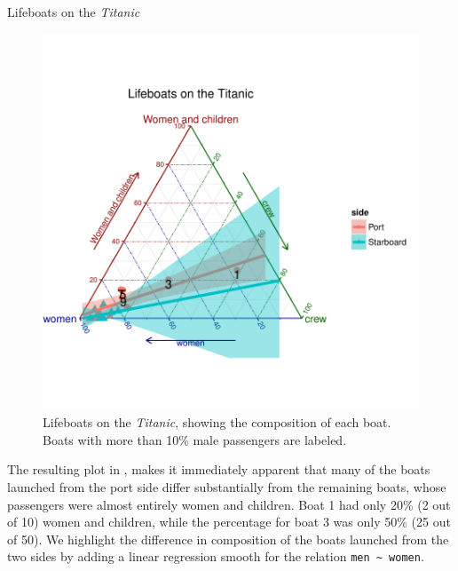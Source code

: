 \documentclass[11pt]{book}
\renewenvironment{knitrout}{\small\renewcommand{\baselinestretch}{.85}}{} %
\begin{document}
\begin{Example}[lifeboat1]{Lifeboats on the \emph{Titanic}}
\begin{knitrout}
\begin{figure}[!htbp]
\centerline{\includegraphics[width=.7\textwidth,clip]{ch04/fig/lifeboats1} }

\caption[Lifeboats on the Titanic]{Lifeboats on the \emph{Titanic}, showing the composition of each boat.  Boats with more than 10\% male passengers are labeled.\label{fig:lifeboats1}}
\end{figure}


\end{knitrout}
The resulting plot in , makes it immediately apparent
that many of the boats launched from the port side differ substantially
from the remaining boats, whose passengers were almost entirely women
and children.  Boat 1 had only 20\% (2 out of 10) women and children, while the percentage for boat 3 was only 50\% (25 out of 50). We highlight the difference in 
composition of the boats launched from the two sides by adding a linear regression
smooth for the relation \verb|men ~ women|.


\end{Example}
\end{document}
